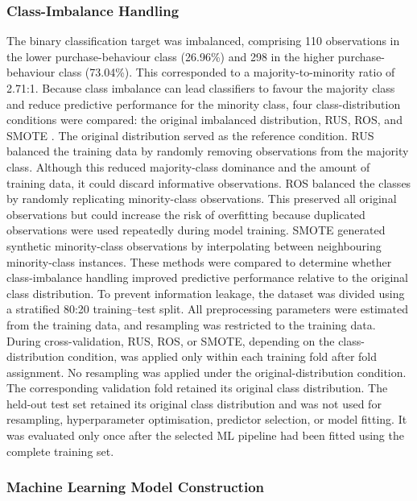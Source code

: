 \documentclass[jtaer,article,submit,moreauthors]{Definitions/mdpi}
\begin{document}
\subsubsection{Class-Imbalance Handling}

The binary classification target was imbalanced, comprising 110
observations in the lower purchase-behaviour class (26.96\%) and 298
in the higher purchase-behaviour class (73.04\%). This corresponded to
a majority-to-minority ratio of 2.71:1. Because class imbalance can
lead classifiers to favour the majority class and reduce predictive
performance for the minority class, four class-distribution conditions
were compared: the original imbalanced distribution, RUS, ROS, and SMOTE \cite{Chawla2002}. The
original distribution served as the reference condition.
RUS balanced the training data by randomly removing observations from
the majority class. Although this reduced majority-class dominance and
the amount of training data, it could discard informative observations.
ROS balanced the classes by randomly replicating minority-class
observations. This preserved all original observations but could
increase the risk of overfitting because duplicated observations were
used repeatedly during model training. SMOTE generated synthetic
minority-class observations by interpolating between neighbouring
minority-class instances. These methods were compared to determine
whether class-imbalance handling improved predictive performance
relative to the original class distribution.
To prevent information leakage, the dataset was divided using a
stratified 80:20 training--test split. All preprocessing parameters
were estimated from the training data, and resampling was restricted
to the training data.
During cross-validation, RUS, ROS, or SMOTE,
depending on the class-distribution condition, was applied only within
each training fold after fold assignment. No resampling was applied under the
original-distribution condition. The corresponding validation
fold retained its original class distribution. The held-out test set
retained its original class distribution and was not used for
resampling, hyperparameter optimisation, predictor selection, or model
fitting. It was evaluated only once after the selected ML pipeline had
been fitted using the complete training set.


\subsubsection{Machine Learning Model Construction}
\end{document}
